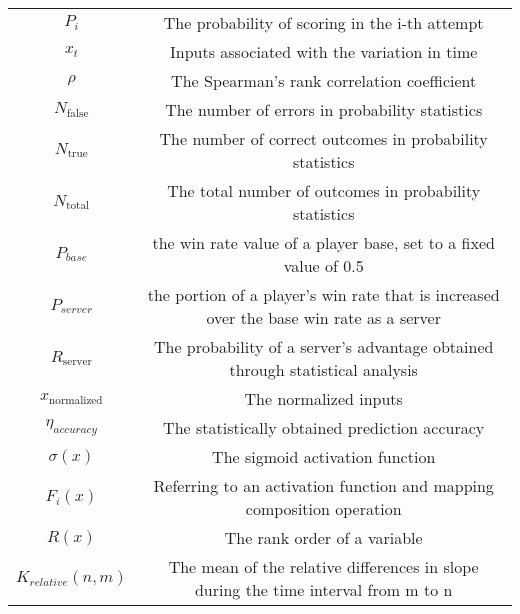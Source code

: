 \begin{table}[h]
\begin{center}
\begin{tabular}{cc}
                \(P_i\) & The probability of scoring in the i-th attempt\\
                \(x_t\) & Inputs associated with the variation in time\\
                \(\rho\) & The Spearman's rank correlation coefficient\\
                \({N_{\text{false}}}\) & The number of errors in probability statistics\\
                \({N_{\text{true}}}\) & The number of correct outcomes in probability statistics\\
                \({N_{\text{total}}}\) & The total number of outcomes in probability statistics\\
                \(P_{base}\) & the win rate value of a player base, set to a fixed value of 0.5\\
                \(P_{server}\) & the portion of a player's win rate that is increased over the base win rate as a server\\
                \(R_{\text{server}}\) & The probability of a server's advantage obtained through statistical analysis\\
                \({x_{\text{normalized}}}\) & The normalized inputs\\
                \(\eta_{accuracy}\) & The statistically obtained prediction accuracy\\
                \(\sigma (x)\) & The sigmoid activation function\\
                \({F_i}(x)\) & Referring to an activation function and mapping composition operation\\
                \(R(x)\) & The rank order of a variable\\
                \({K_{relative}}(n, m)\) & The mean of the relative differences in slope during the time interval from m to n\\
			\bottomrule[1.5pt]
		\end{tabular}
	\end{center}
\end{table}

